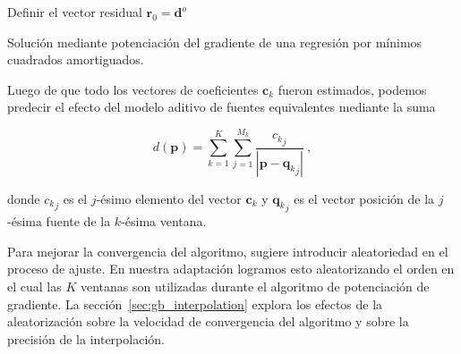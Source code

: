 \begin{algorithm}[!h]
  \DontPrintSemicolon
  Definir el vector residual $\mathbf{r}_{0} = \mathbf{d}^o$ \;
  \BlankLine
  \caption{
      Solución mediante potenciación del gradiente de una regresión por mínimos
      cuadrados amortiguados.
  }
  \label{alg:gradient_boosting}
\end{algorithm}

Luego de que todo los vectores de coeficientes $\mathbf{c}_k$ fueron estimados,
podemos predecir el efecto del modelo aditivo de fuentes equivalentes mediante
la suma

\begin{equation}
    d(\mathbf{p}) =
    \sum\limits_{k=1}^K \sum\limits_{j=1}^{M_k}
    \frac{{c_k}_j}{| \mathbf{p} - {\mathbf{q}_k}_j |}
    \ ,
    \label{eq:eql-forward-gb}
\end{equation}

\noindent donde ${c_k}_j$ es el $j$-ésimo elemento del vector $\mathbf{c}_k$
y ${\mathbf{q}_k}_j$ es el vector posición de la $j$-ésima fuente de la
$k$-ésima ventana.

Para mejorar la convergencia del algoritmo, \citet{friedman2002} sugiere
introducir aleatoriedad en el proceso de ajuste.
En nuestra adaptación logramos esto aleatorizando el orden en el cual las $K$
ventanas son utilizadas durante el algoritmo de potenciación de gradiente.
La sección~\ref{sec:gb_interpolation} explora los efectos de la aleatorización
sobre la velocidad de convergencia del algoritmo y sobre la precisión de la
interpolación.

